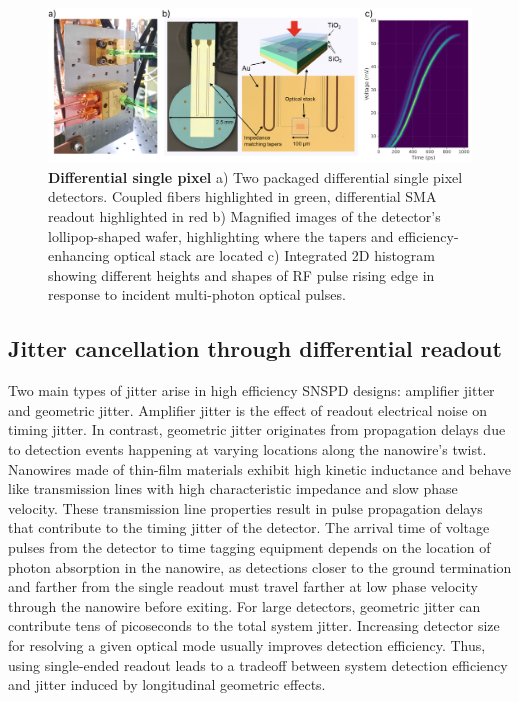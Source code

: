 \documentclass[11pt]{caltech_thesis} %
\begin{document}
\hypertarget{fig:diff}{%
\begin{figure}
\centering
\includegraphics{./chapter_01/figs/diff_light.png}
\caption[{Differential Single Pixel}]{\textbf{Differential single pixel} a) Two packaged differential single pixel detectors. Coupled fibers highlighted in green, differential SMA readout highlighted in red b) Magnified images of the detector's lollipop-shaped wafer, highlighting where the tapers and efficiency-enhancing optical stack are located c) Integrated 2D histogram showing different heights and shapes of RF pulse rising edge in response to incident multi-photon optical pulses.}
\label{fig:diff}
\end{figure}
}

\hypertarget{jitter-cancellation-through-differential-readout}{%
\subsection{Jitter cancellation through differential readout}\label{jitter-cancellation-through-differential-readout}}

Two main types of jitter arise in high efficiency SNSPD designs: amplifier jitter and geometric jitter. Amplifier jitter is the effect of readout electrical noise on timing jitter. In contrast, geometric jitter originates from propagation delays due to detection events happening at varying locations along the nanowire's twist. Nanowires made of thin-film materials exhibit high kinetic inductance and behave like transmission lines with high characteristic impedance and slow phase velocity. These transmission line properties result in pulse propagation delays that contribute to the timing jitter of the detector. The arrival time of voltage pulses from the detector to time tagging equipment depends on the location of photon absorption in the nanowire, as detections closer to the ground termination and farther from the single readout must travel farther at low phase velocity through the nanowire before exiting. For large detectors, geometric jitter can contribute tens of picoseconds to the total system jitter. Increasing detector size for resolving a given optical mode usually improves detection efficiency. Thus, using single-ended readout leads to a tradeoff between system detection efficiency and jitter induced by longitudinal geometric effects.
\end{document}
